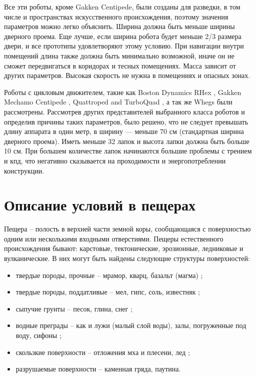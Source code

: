 Все эти роботы, кроме Gakken Centipede, были созданы для разведки, в том числе и пространствах искусственного происхождения, поэтому значения параметров можно легко объяснить. Ширина должна быть меньше ширины дверного проема. Еще лучше, если ширина робота будет меньше 2/3 размера двери, и все прототипы удовлетворяют этому условию. При навигации внутри помещений длина также должна быть минимально возможной, иначе он не сможет передвигаться в коридорах и тесных помещениях. Масса зависит от других параметров. Высокая скорость не нужна в помещениях и опасных зонах. 

Роботы с цикловым движителем, такие как Boston Dynamics RHex \cite{Altendorfer2001}, Gakken Mechamo Centipede \cite{Miller2019}, Quattroped and TurboQuad \cite{Chen2011,Chen2014,Chen2017}, а так же Whegs \cite{schroerComparingCockroachWhegs2004} были рассмотрены. Рассмотрев других представителей выбранного класса роботов и определив причины таких параметров, было решено, что не следует превышать длину аппарата в один метр, в ширину --- меньше 70 см (стандартная ширина дверного проема). Иметь меньше 32 лапок и высота лапки должна быть больше 10 см. При большем количестве лапок начинаются большие проблемы с трением и кпд, что негативно сказывается на проходимости и энергопотреблении конструкции.


\section{Описание условий в пещерах}
Пещера -- полость в верхней части земной коры, сообщающаяся с поверхностью одним или несколькими входными отверстиями. Пещеры естественного происхождения бывают: карстовые, тектонические, эрозионные, ледниковые и вулканические. В них могут быть найдены следующие структуры поверхностей:
\begin{itemize}
    \item твердые породы, прочные -- мрамор, кварц, базальт (магма) ;
    \item твердые породы, поддатливые -- мел, гипс, соль, известняк ;
    \item сыпучие грунты -- песок, глина, снег ;
    \item водные преграды -- как и лужи (малый слой воды), залы, погруженные под воду, сифоны ;
    \item скользкие поверхности -- отложения мха и плесени, лед ;
    \item разрушаемые поверхности -- каменная гряда, паутина.
\end{itemize}


